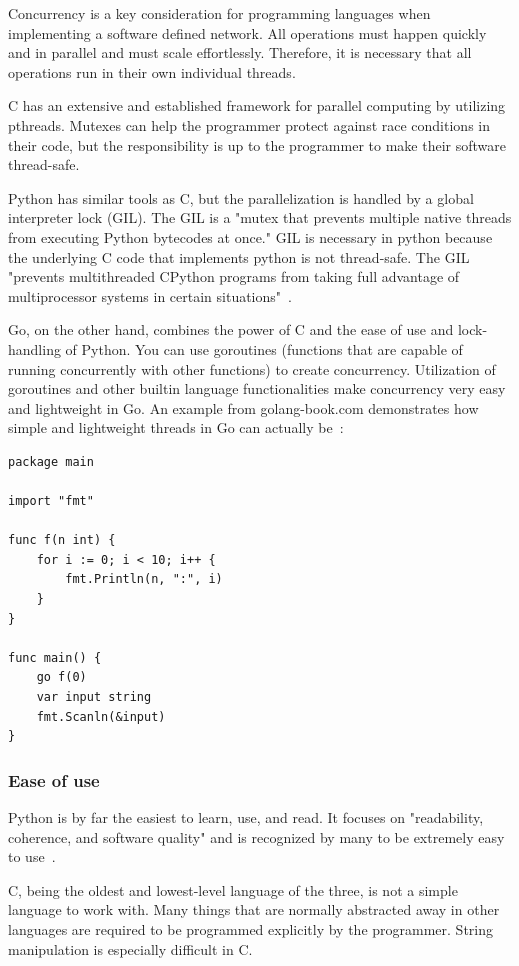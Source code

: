 \documentclass[10pt,letterpaper,onecolumn,journal]{IEEEtran}
\begin{document}
Concurrency is a key consideration for programming languages when implementing a
software defined network. All operations must happen quickly and in parallel and
must scale effortlessly. Therefore, it is necessary that all operations run in
their own individual threads.

C has an extensive and established framework for parallel computing by utilizing
pthreads. Mutexes can help the programmer protect against race conditions in
their code, but the responsibility is up to the programmer to make their
software thread-safe.

Python has similar tools as C, but the parallelization is handled by a global
interpreter lock (GIL). The GIL is a "mutex that prevents multiple native
threads from executing Python bytecodes at once." GIL is necessary in python
because the underlying C code that implements python is not thread-safe. The GIL
"prevents multithreaded CPython programs from taking full advantage of
multiprocessor systems in certain situations"~\cite{GIL}.

Go, on the other hand, combines the power of C and the ease of use and
lock-handling of Python. You can use goroutines (functions that are capable of
running concurrently with other functions) to create concurrency. Utilization of
goroutines and other builtin language functionalities make concurrency very easy
and lightweight in Go. An example from golang-book.com demonstrates how simple
and lightweight threads in Go can actually be~\cite{goroutines}:

\begin{lstlisting}
package main

import "fmt"

func f(n int) {
	for i := 0; i < 10; i++ {
		fmt.Println(n, ":", i)
	}
}

func main() {
	go f(0)
	var input string
	fmt.Scanln(&input)
}
\end{lstlisting}

\subsubsection{Ease of use}

Python is by far the easiest to learn, use, and read. It focuses on
"readability, coherence, and software quality" and is recognized by many to be
extremely easy to use~\cite{learningpython}.

C, being the oldest and lowest-level language of the three, is not a simple
language to work with. Many things that are normally abstracted away in other
languages are required to be programmed explicitly by the programmer. String
manipulation is especially difficult in C.
\end{document}
